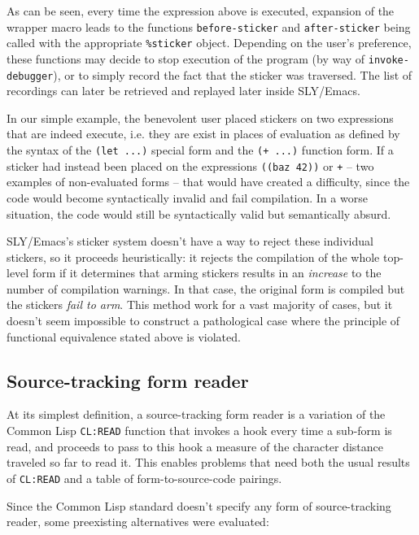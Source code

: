 \documentclass[sigconf]{acmart}
\begin{document}
As can be seen, every time the expression above is executed, expansion
of the wrapper macro leads to the functions \texttt{before-sticker}
and \texttt{after-sticker} being called with the appropriate
\texttt{\%sticker} object.  Depending on the user's preference, these
functions may decide to stop execution of the program (by way of
\texttt{invoke-debugger}), or to simply record the fact that the
sticker was traversed.  The list of recordings can later be retrieved
and replayed later inside SLY/Emacs.

In our simple example, the benevolent user placed stickers on two
expressions that are indeed execute, i.e. they are exist in places of
evaluation as defined by the syntax of the \texttt{(let ...)}  special
form and the \texttt{(+ ...)} function form.  If a sticker had instead
been placed on the expressions \texttt{((baz 42))} or \texttt{+} --
two examples of non-evaluated forms -- that would have created a
difficulty, since the code would become syntactically invalid and fail
compilation.  In a worse situation, the code would still be
syntactically valid but semantically absurd.

SLY/Emacs's sticker system doesn't have a way to reject these
individual stickers, so it proceeds heuristically: it rejects the
compilation of the whole top-level form if it determines that arming
stickers results in an \emph{increase} to the number of compilation
warnings.  In that case, the original form is compiled but the
stickers \emph{fail to arm}.  This method work for a vast majority of
cases, but it doesn't seem impossible to construct a pathological case
where the principle of functional equivalence stated above is
violated.

\subsection{Source-tracking form reader}\label{st-reader}

At its simplest definition, a source-tracking form reader is a
variation of the Common Lisp \texttt{CL:READ} function that invokes a
hook every time a sub-form is read, and proceeds to pass to this hook
a measure of the character distance traveled so far to read it.  This
enables problems that need both the usual results of \texttt{CL:READ}
and a table of form-to-source-code pairings.

Since the Common Lisp standard doesn't specify any form of
source-tracking reader, some preexisting alternatives were evaluated:
\end{document}
